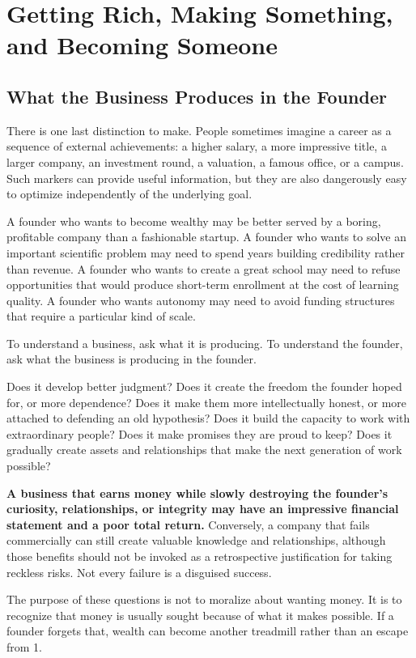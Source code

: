 \section{Getting Rich, Making Something, and Becoming Someone}

\subsection{What the Business Produces in the Founder}

There is one last distinction to make. People sometimes imagine a career as a sequence of external achievements: a higher salary, a more impressive title, a larger company, an investment round, a valuation, a famous office, or a campus. Such markers can provide useful information, but they are also dangerously easy to optimize independently of the underlying goal.

A founder who wants to become wealthy may be better served by a boring, profitable company than a fashionable startup. A founder who wants to solve an important scientific problem may need to spend years building credibility rather than revenue. A founder who wants to create a great school may need to refuse opportunities that would produce short-term enrollment at the cost of learning quality. A founder who wants autonomy may need to avoid funding structures that require a particular kind of scale.

To understand a business, ask what it is producing. To understand the founder, ask what the business is producing in the founder.

Does it develop better judgment? Does it create the freedom the founder hoped for, or more dependence? Does it make them more intellectually honest, or more attached to defending an old hypothesis? Does it build the capacity to work with extraordinary people? Does it make promises they are proud to keep? Does it gradually create assets and relationships that make the next generation of work possible?

\textbf{A business that earns money while slowly destroying the founder's curiosity, relationships, or integrity may have an impressive financial statement and a poor total return.} Conversely, a company that fails commercially can still create valuable knowledge and relationships, although those benefits should not be invoked as a retrospective justification for taking reckless risks. Not every failure is a disguised success.

The purpose of these questions is not to moralize about wanting money. It is to recognize that money is usually sought because of what it makes possible. If a founder forgets that, wealth can become another treadmill rather than an escape from 1.
